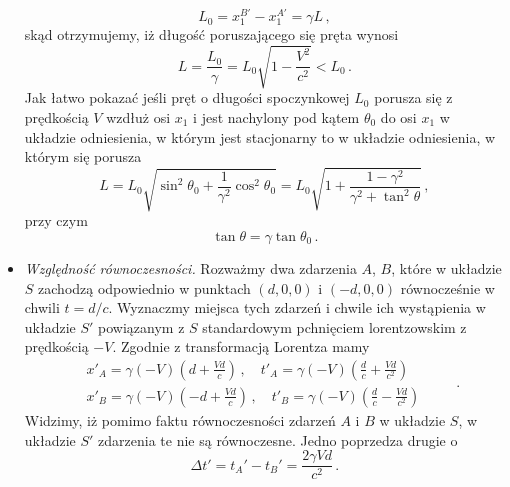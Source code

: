 \documentclass[../main.tex]{subfiles}
\begin{document}
\begin{itemize}
\begin{equation*}
        L_0=x_1^{B'}-x_1^{A'}=\gamma L\,,
    \end{equation*}
    skąd otrzymujemy, iż długość poruszającego się pręta wynosi
    \begin{equation*}
        L=\frac{L_0}{\gamma}=L_0\sqrt{1-\frac{V^2}{c^2}}<L_0\,.
    \end{equation*}
    Jak łatwo pokazać jeśli pręt o długości spoczynkowej \(L_0\) porusza się z prędkością \(V\)
    wzdłuż osi \(x_1\) i jest nachylony pod kątem \(\theta_0\) do osi \(x_1\) w układzie
    odniesienia, w którym jest stacjonarny to w układzie odniesienia, w którym się porusza
    \begin{equation*}
        L=L_0\sqrt{\sin^2\theta_0+\frac{1}{\gamma^2}\cos^2\theta_0}=L_0\sqrt{1+\frac{1-\gamma^2}{\gamma^2+\tan^2\theta}}\,,
    \end{equation*}
    przy czym
    \begin{equation*}
        \tan\theta=\gamma\tan\theta_0\,.
    \end{equation*}
    \item\textit{Względność równoczesności.} Rozważmy dwa zdarzenia \(A\), \(B\), które w układzie
    \(S\) zachodzą odpowiednio w punktach \((d,0,0)\) i \((-d,0,0)\) równocześnie w chwili
    \(t=d/c\). Wyznaczmy miejsca tych zdarzeń i chwile ich wystąpienia w układzie \(S'\) powiązanym
    z \(S\) standardowym pchnięciem lorentzowskim z prędkością \(-V\). Zgodnie z transformacją
    Lorentza mamy
    \begin{equation*}
        \begin{split}
            &x'_A=\gamma(-V)\left(d+\frac{Vd}{c}\right)\,,\quad t'_A=\gamma(-V)\left(\frac{d}{c}+\frac{Vd}{c^2}\right)\\
            &x'_B=\gamma(-V)\left(-d+\frac{Vd}{c}\right)\,,\quad t'_B=\gamma(-V)\left(\frac{d}{c}-\frac{Vd}{c^2}\right)
        \end{split}\quad\quad\,.
    \end{equation*}
    Widzimy, iż pomimo faktu równoczesności zdarzeń \(A\) i \(B\) w układzie \(S\), w układzie
    \(S'\) zdarzenia te nie są równoczesne. Jedno poprzedza drugie o
    \begin{equation*}
        \Delta t'=t_A'-t_B'=\frac{2\gamma Vd}{c^2}\,.
    \end{equation*}
\end{itemize}
\end{document}

